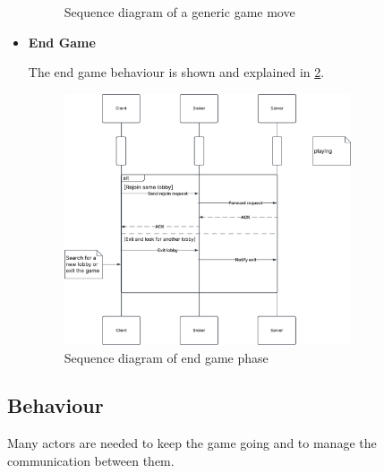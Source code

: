 \documentclass{scrartcl}
\begin{document}
\begin{itemize}
\begin{figure}
                  \caption{Sequence diagram of a generic game move}
                  \label{fig:game-move}
            \end{figure}
      \item \textbf{End Game} \par
            The end game behaviour is shown and explained in \cref{fig:end-game}.
            \begin{figure}
                  \centering
                  \includegraphics[width=0.8\textwidth]{figures/sequenceEndGame.png}
                  \caption{Sequence diagram of end game phase}
                  \label{fig:end-game}
            \end{figure}
\end{itemize}
\newpage
\subsection{Behaviour}\label{behaviour}
Many actors are needed to keep the game going and to manage the communication between them.
\end{document}

